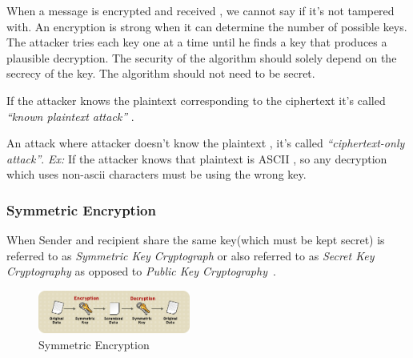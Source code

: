 \documentclass[a4paper]{article}
\begin{document}
When a message is encrypted and received , we cannot say if it's not tampered with. An encryption is strong when 
it can determine the number of possible keys. The attacker tries each key one at a time until he finds a key that 
produces a plausible decryption. The security of the algorithm should solely depend on the secrecy of the key. 
The algorithm should not need to be secret.

If the attacker knows the plaintext corresponding to the ciphertext it's called \textit{``known plaintext attack''} .

An attack where attacker doesn't know the plaintext , it's called \textit{``ciphertext-only attack''}.
\textit{Ex:} If the attacker knows that plaintext is ASCII , so any decryption which uses non-ascii characters must be using the wrong key.
\subsubsection{Symmetric Encryption}
When Sender and recipient share the same key(which must be kept secret) is referred to as \textit{Symmetric Key Cryptograph} or also
referred to as \textit{Secret Key Cryptography} as opposed to \textit{Public Key Cryptography}~\cite{eric}.
\begin{figure}[h]
    \centering
    \includegraphics[width=50mm]{symmetric.png}
    \caption{Symmetric Encryption ~\cite{RedHat:Symmetric}}
\end{figure}
\end{document}
